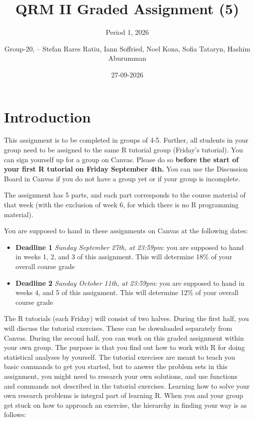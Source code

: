 \documentclass[
]{article}
\title{QRM II Graded Assignment (5)}
\subtitle{Period 1, 2026}
\author{Group-20, -- Stefan Rares Ratiu, Iann Soffried, Noel Kona, Sofia
Tataryn, Hashim Aburumman}
\date{27-09-2026}
\providecommand{\tightlist}{%
  \setlength{\itemsep}{0pt}\setlength{\parskip}{0pt}}
\begin{document}
\maketitle

\section{Introduction}\label{introduction}

This assignment is to be completed in groups of 4-5. Further, all
students in your group need to be assigned to the same R tutorial group
(Friday's tutorial). You can sign yourself up for a group on Canvas.
Please do so
\textbf{before the start of your first R tutorial on Friday September 4th.}
You can use the Discussion Board in Canvas if you do not have a group
yet or if your group is incomplete.

The assignment has 5 parts, and each part corresponds to the course
material of that week (with the exclusion of week 6, for which there is
no R programming material).

You are supposed to hand in these assignments on Canvas at the following
dates:

\begin{itemize}
\tightlist
\item
  \textbf{Deadline 1} \emph{Sunday September 27th, at 23:59pm}: you are
  supposed to hand in weeks 1, 2, and 3 of this assignment. This will
  determine 18\% of your overall course grade
\item
  \textbf{Deadline 2} \emph{Sunday October 11th, at 23:59pm}: you are
  supposed to hand in weeks 4, and 5 of this assignment. This will
  determine 12\% of your overall course grade
\end{itemize}

The R tutorials (each Friday) will consist of two halves. During the
first half, you will discuss the tutorial exercises. These can be
downloaded separately from Canvas. During the second half, you can work
on this graded assignment within your own group. The purpose is that you
find out how to work with R for doing statistical analyses by yourself.
The tutorial exercises are meant to teach you basic commands to get you
started, but to answer the problem sets in this assignment, you might
need to research your own solutions, and use functions and commands not
described in the tutorial exercises. Learning how to solve your own
research problems is integral part of learning R. When you and your
group get stuck on how to approach an exercise, the hierarchy in finding
your way is as follows:
\end{document}
